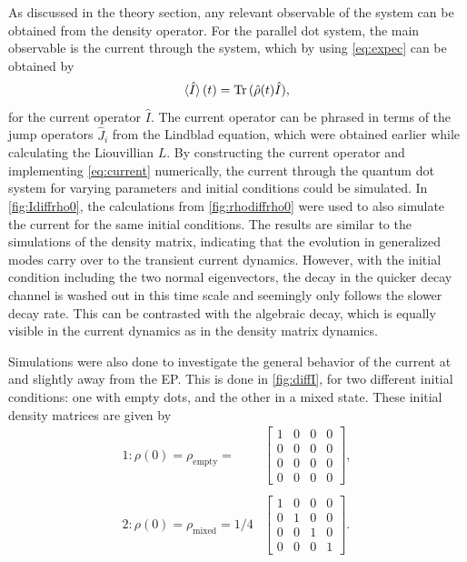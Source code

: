 \documentclass[../main.tex]{subfiles}
\begin{document}
As discussed in the theory section, any relevant observable of the system can be obtained from the density operator. For the parallel dot system, the main observable is the current through the system, which by using \cref{eq:expec} can be obtained by
\begin{equation}\label{eq:current}
    \braket{\hat I}(t) = \operatorname{Tr}{(\hat \rho(t)\hat I)},
\end{equation}
for the current operator $\hat I$. The current operator can be phrased in terms of the jump operators $\hat{J}_i$ from the Lindblad equation, which were obtained earlier while calculating the Liouvillian $L$. By constructing the current operator and implementing \cref{eq:current} numerically, the current through the quantum dot system for varying parameters and initial conditions could be simulated. In \cref{fig:Idiffrho0}, the calculations from \cref{fig:rhodiffrho0} were used to also simulate the current for the same initial conditions. The results are similar to the simulations of the density matrix, indicating that the evolution in generalized modes carry over to the transient current dynamics. However, with the initial condition including the two normal eigenvectors, the decay in the quicker decay channel is washed out in this time scale and seemingly only follows the slower decay rate. This can be contrasted with the algebraic decay, which is equally visible in the current dynamics as in the density matrix dynamics.


Simulations were also done to investigate the general behavior of the current at and slightly away from the EP. This is done in \cref{fig:diffI}, for two different initial conditions: one with empty dots, and the other in a mixed state. These initial density matrices are given by
\begin{equation}\label{eq:initialI}
\begin{split}
    1: \rho(0) = \rho_\text{empty} = &\begin{bmatrix} 1 & 0 & 0 & 0 \\
                                             0 & 0 & 0 & 0 \\
                                             0 & 0 & 0 & 0 \\
                                         0 & 0 & 0 & 0 \end{bmatrix},\\ \\
        2: \rho(0) = \rho_\text{mixed} = 1/4 &\begin{bmatrix} 1 & 0 & 0 & 0 \\
                                             0 & 1 & 0 & 0 \\
                                             0 & 0 & 1 & 0 \\
                                            0 & 0 & 0 & 1 \end{bmatrix}.
\end{split}
\end{equation}
\end{document}
